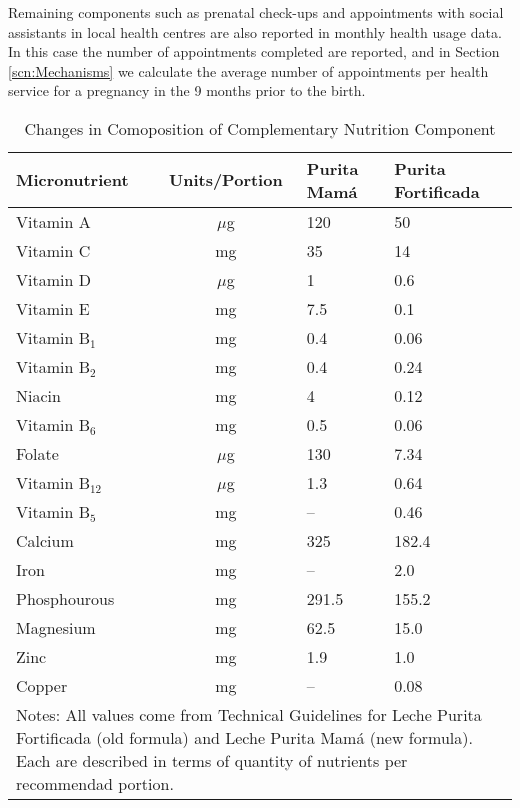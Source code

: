 \documentclass[12pt]{article}
\begin{document}
\begin{spacing}{1.4}
Remaining components such as prenatal check-ups and appointments
with social assistants in local health centres are also reported
in monthly health usage data.  In this case the number of
appointments completed are reported, and in Section \ref{scn:Mechanisms}
we calculate the average number of appointments per health service
for a pregnancy in the 9 months prior to the birth.

\begin{table}[htpb]
  \caption{Changes in Comoposition of Complementary Nutrition Component}
  \label{lechepurita}
  \begin{tabular}{lcll} \toprule
    Micronutrient & Units/Portion & Purita Mam\'a&Purita Fortificada \\ \midrule
    Vitamin A & $\mu$g &120&50\\
    Vitamin C & mg     &35&14\\
    Vitamin D & $\mu$g &1&0.6\\
    Vitamin E & mg     &7.5&0.1\\
    Vitamin B$_1$ & mg &0.4&0.06\\
    Vitamin B$_2$ & mg &0.4&0.24\\
    Niacin & mg        &4&0.12\\
    Vitamin B$_6$ & mg &0.5&0.06\\
    Folate  &  $\mu$g  &130 &7.34\\
    Vitamin B$_{12}$   & $\mu$g&1.3&0.64\\
    Vitamin B$_{5}$    & mg& --&0.46\\
    Calcium  &mg       &325&182.4\\
    Iron  &mg          &--&2.0\\
    Phosphourous  &mg  &291.5&155.2\\
    Magnesium &mg      &62.5&15.0\\
    Zinc &mg           &1.9&1.0\\ 
    Copper &mg         &--&0.08\\ \bottomrule
    \multicolumn{4}{p{11cm}}{{\footnotesize Notes: All values come from Technical
        Guidelines for Leche Purita Fortificada (old formula) and Leche Purita Mam\'a
        (new formula).  Each are described in terms of quantity of nutrients per
        recommendad portion.}}
  \end{tabular}
\end{table}


\setcounter{table}{0}
\renewcommand{\thetable}{C\arabic{table}}
\setcounter{figure}{0}
\renewcommand{\thefigure}{C\arabic{figure}}

\end{spacing}
\end{document}
